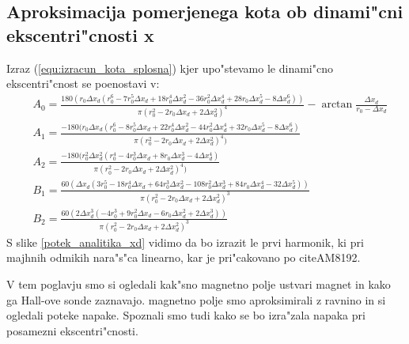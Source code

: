 \subsection{Aproksimacija pomerjenega kota ob dinami"cni ekscentri"cnosti x}
Izraz  (\ref{equ:izracun_kota_splosna}) kjer upo"stevamo le dinami"cno ekscentri"cnost se poenostavi v:
\begin{eqnarray}
&A_0=\frac{180(r_0 \Delta x_d(r_0^6-7r_0^5 \Delta x_d+18r_0^4 \Delta x_d^2-36r_0^2 \Delta x_d^4 +28r_0 \Delta x_d^5-8 \Delta x_d^6))}{\pi(r_0^2-2r_0 \Delta x_d+2 \Delta x_d^2)^4}-\arctan \frac{\Delta x_d}{r_0- \Delta x_d}\\
&A_1=\frac{-180(r_0 \Delta x_d(r_0^6-8r_0^5 \Delta x_d+22r_0^4 \Delta x_d^2-44r_0^2 \Delta x_d^4 
	+32r_0 \Delta x_d^5-8 \Delta x_d^6)}{\pi (r_0^2-2r_0 \Delta x_d+2 \Delta x_d^2)^4)}\\
&A_2=\frac{-180(r_0^2 \Delta x_d^2 (r_0^4-4 r_0^3  \Delta x_d+8 r_0  \Delta x_d^3-4 
	\Delta x_d^4)}{\pi (r_0^2-2 r_0  \Delta x_d+2  \Delta x_d^2)^4)}\\
&B_1=\frac{60( \Delta x_d (3 r_0^5-18 r_0^4  \Delta x_d+64 r_0^3  \Delta x_d^2 -108 
	r_0^2  \Delta x_d^3+84 r_0  \Delta x_d^4-32  \Delta x_d^5))}{\pi (r_0^2-2 r_0 
	\Delta x_d+2  \Delta x_d^2)^3}\\
&B_2=\frac{60 (2  \Delta x_d^3 (-4 r_0^3+9 r_0^2  \Delta x_d-6 r_0  \Delta x_d^2+2  \Delta x_d
	^3))}{\pi(r_0^2-2 r_0  \Delta x_d+2  \Delta x_d^2)^3}
\end{eqnarray}
S slike \ref{potek_analitika_xd} vidimo da bo izrazit le prvi harmonik, ki pri majhnih odmikih nara"s"ca linearno, kar je pri"cakovano po citeAM8192. 

V tem poglavju smo si ogledali kak"sno magnetno polje ustvari magnet in kako ga Hall-ove sonde zaznavajo. magnetno polje smo aproksimirali z ravnino in si ogledali poteke napake.  Spoznali smo tudi kako se bo izra"zala napaka pri posamezni ekscentri"cnosti.





















